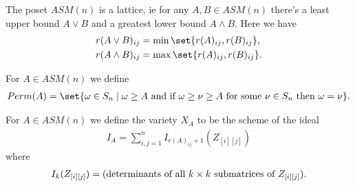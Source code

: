\begin{example}
\begin{center}
    \end{center}
\end{example}

\begin{theorem}
    The poset $ASM(n)$ is a lattice, ie for any $A, B \in ASM(n)$ there's a least upper bound $A \lor B$ and a greatest lower bound $A \land B$. Here we have
    \begin{align*}
        r(A \lor B)_{ij} &= \min \set{ r(A)_{ij}, r(B)_{ij} },\\
        r(A \land B)_{ij} &= \max \set{ r(A)_{ij}, r(B)_{ij} }.
    \end{align*}
\end{theorem}

\begin{definition}
    For $A \in ASM(n)$ we define 
    \begin{align*}
        Perm(A) = \set{\omega \in S_n \mid \omega \geq A \text{ and if } \omega \geq \nu \geq A \text{ for some } \nu \in S_n \text{ then } \omega = \nu}.
    \end{align*}
\end{definition}

\begin{definition}
    For $A \in ASM(n)$ we define the variety $X_A$ to be the scheme of the ideal
    \begin{align*}
        I_A = \sum_{i,j = 1}^n I_{r(A)_{ij} + 1} (Z_{[i] [j]})
    \end{align*}
    where
    \begin{align*}
        I_k (Z_{[i] [j]}) = ( \text{determinants of all $ k \times k$ submatrices of } Z_{[i] [j]}). 
    \end{align*}
\end{definition}

